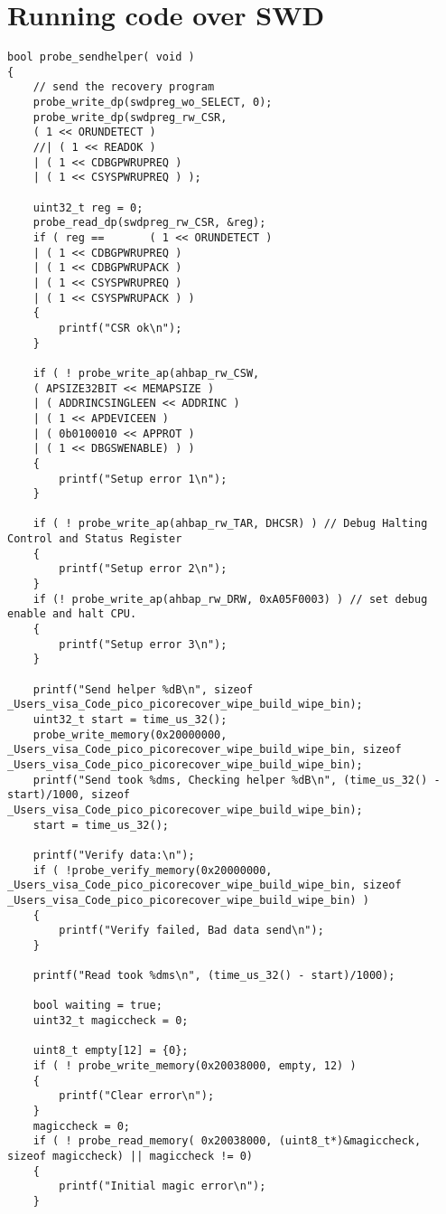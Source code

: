 
\chapter{Running code over SWD}\label{appx:first}

\begin{code}
	\begin{verbatim}
bool probe_sendhelper( void )
{
	// send the recovery program
	probe_write_dp(swdpreg_wo_SELECT, 0);
	probe_write_dp(swdpreg_rw_CSR,
	( 1 << ORUNDETECT )
	//| ( 1 << READOK )
	| ( 1 << CDBGPWRUPREQ )
	| ( 1 << CSYSPWRUPREQ ) );
	
	uint32_t reg = 0;
	probe_read_dp(swdpreg_rw_CSR, &reg);
	if ( reg ==       ( 1 << ORUNDETECT )
	| ( 1 << CDBGPWRUPREQ )
	| ( 1 << CDBGPWRUPACK )
	| ( 1 << CSYSPWRUPREQ ) 
	| ( 1 << CSYSPWRUPACK ) )
	{
		printf("CSR ok\n");
	}
	
	if ( ! probe_write_ap(ahbap_rw_CSW, 
	( APSIZE32BIT << MEMAPSIZE )
	| ( ADDRINCSINGLEEN << ADDRINC )  
	| ( 1 << APDEVICEEN )
	| ( 0b0100010 << APPROT )
	| ( 1 << DBGSWENABLE) ) )
	{
		printf("Setup error 1\n"); 
	}
	
	if ( ! probe_write_ap(ahbap_rw_TAR, DHCSR) ) // Debug Halting Control and Status Register
	{
		printf("Setup error 2\n");
	}
	if (! probe_write_ap(ahbap_rw_DRW, 0xA05F0003) ) // set debug enable and halt CPU.
	{
		printf("Setup error 3\n");
	}
	
	printf("Send helper %dB\n", sizeof _Users_visa_Code_pico_picorecover_wipe_build_wipe_bin);
	uint32_t start = time_us_32();
	probe_write_memory(0x20000000, _Users_visa_Code_pico_picorecover_wipe_build_wipe_bin, sizeof _Users_visa_Code_pico_picorecover_wipe_build_wipe_bin);
	printf("Send took %dms, Checking helper %dB\n", (time_us_32() - start)/1000, sizeof _Users_visa_Code_pico_picorecover_wipe_build_wipe_bin);
	start = time_us_32();
	
	printf("Verify data:\n"); 
	if ( !probe_verify_memory(0x20000000, _Users_visa_Code_pico_picorecover_wipe_build_wipe_bin, sizeof _Users_visa_Code_pico_picorecover_wipe_build_wipe_bin) )
	{
		printf("Verify failed, Bad data send\n"); 
	}
	
	printf("Read took %dms\n", (time_us_32() - start)/1000);
	
	bool waiting = true;
	uint32_t magiccheck = 0;
	
	uint8_t empty[12] = {0};
	if ( ! probe_write_memory(0x20038000, empty, 12) )
	{
		printf("Clear error\n");
	}
	magiccheck = 0;
	if ( ! probe_read_memory( 0x20038000, (uint8_t*)&magiccheck, sizeof magiccheck) || magiccheck != 0)
	{
		printf("Initial magic error\n");
	}
	

\end{verbatim}
\end{code}
